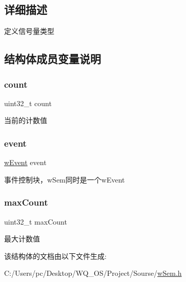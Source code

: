 \subsection{详细描述}
定义信号量类型 

\subsection{结构体成员变量说明}
\mbox{\label{struct__w_sem_a86988a65e0d3ece7990c032c159786d6}} 
\subsubsection{\texorpdfstring{count}{count}}
{\footnotesize\ttfamily uint32\+\_\+t count}

当前的计数值 \mbox{\label{struct__w_sem_ad737d3f95a5cf9ee457f37f1cedfa44a}} 
\subsubsection{\texorpdfstring{event}{event}}
{\footnotesize\ttfamily \mbox{\hyperlink{w_event_8h_af8b15988a26e1ac0d63eaf3fc5afe9d3}{w\+Event}} event}

事件控制块，w\+Sem同时是一个w\+Event \mbox{\label{struct__w_sem_a1cc8a4ba5eee24b560f9869012941e91}} 
\subsubsection{\texorpdfstring{max\+Count}{maxCount}}
{\footnotesize\ttfamily uint32\+\_\+t max\+Count}

最大计数值 

该结构体的文档由以下文件生成\+:\begin{DoxyCompactItemize}
\item 
C\+:/\+Users/pc/\+Desktop/\+W\+Q\+\_\+\+O\+S/\+Project/\+Sourse/\mbox{\hyperlink{w_sem_8h}{w\+Sem.\+h}}\end{DoxyCompactItemize}
